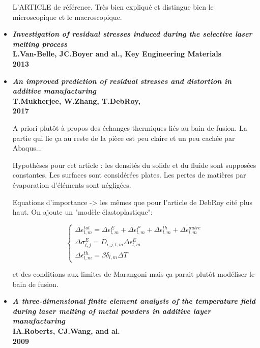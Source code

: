 \documentclass[11pt,a4paper]{article}
\begin{document}
\begin{itemize}
		L'ARTICLE de référence. Très bien expliqué et distingue bien le microscopique et le macroscopique.
		
		\item \textbf{\emph{Investigation of residual stresses induced during the selective laser melting process} \\
			L.Van-Belle, JC.Boyer and al., Key Engineering Materials \\
			2013} 
		
		\item \textbf{\emph{An improved prediction of residual stresses and distortion in additive manufacturing} \\
			T.Mukherjee, W.Zhang, T.DebRoy, \\
			2017}
		
		\vspace{0cm}
		
		A priori plutôt à propos des échanges thermiques liés au bain de fusion. La partie qui lie ça au reste de la pièce est peu claire et un peu cachée par Abaqus...
		
		\vspace{0cm}
		Hypothèses pour cet article : les densités du solide et du fluide sont supposées constantes. Les surfaces sont considérées plates. Les pertes de matières par évaporation d'éléments sont négligées.
		
		Equations d'importance -> les mêmes que pour l'article de DebRoy cité plus haut.
		On ajoute un "modèle élastoplastique":
		
		\begin{equation}
		\left\{
		\begin{array}{l}
		\Delta\epsilon_{l,m}^{tot}=\Delta\epsilon_{l,m}^{E}+\Delta\epsilon_{l,m}^{P}+\Delta\epsilon_{l,m}^{th}+\Delta\epsilon_{l,m}^{autre} \\
		\Delta\sigma_{i,j}^{E}=D_{i,j,l,m}\Delta\epsilon_{l,m}^{E} \\
		\Delta\epsilon_{l,m}^{th}=\beta\delta_{l,m}\Delta T
		\end{array}
		\right.
		\end{equation}
		
		et des conditions aux limites de Marangoni mais ça parait plutôt modéliser le bain de fusion.
		
		\item \textbf{\emph{A three-dimensional finite element analysis of the temperature field during laser melting of metal powders in additive layer manufacturing} \\
			IA.Roberts, CJ.Wang, and al. \\
			2009}
		

\end{itemize}
\end{document}
